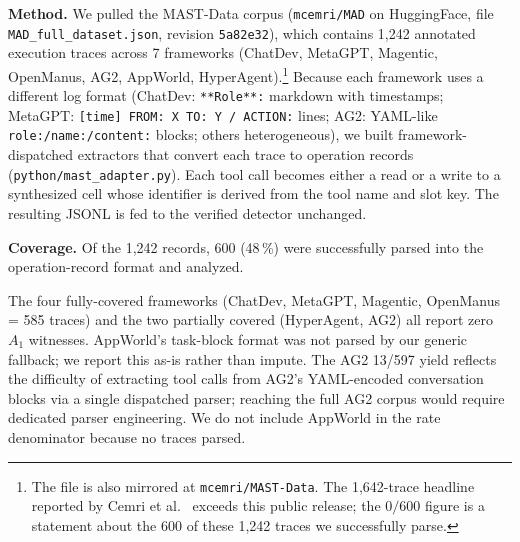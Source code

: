 \documentclass[journal,compsoc,10pt]{IEEEtran}
\providecommand{\citep}{\cite}
\theoremstyle{definition}
\theoremstyle{remark}
\begin{document}
\medskip
\noindent\textbf{Method.}
We pulled the MAST-Data corpus (\texttt{mcemri/MAD} on
HuggingFace, file \texttt{MAD\_full\_dataset.json}, revision
\texttt{5a82e32}), which contains 1{,}242 annotated execution
traces across 7 frameworks (ChatDev, MetaGPT, Magentic,
OpenManus, AG2, AppWorld, HyperAgent).\footnote{The file is
also mirrored at \texttt{mcemri/MAST-Data}. The 1{,}642-trace
headline reported by Cemri et al.~\citep{CemriEtAl2025MAST}
exceeds this public release; the $0/600$ figure is a statement
about the 600 of these 1{,}242 traces we successfully parse.} Because each
framework uses a different log format
(ChatDev: \texttt{**Role**:} markdown with timestamps;
MetaGPT: \texttt{[time] FROM: X TO: Y / ACTION:} lines;
AG2: YAML-like \texttt{role:/name:/content:} blocks;
others heterogeneous), we built framework-dispatched
extractors that convert each trace to operation records
(\texttt{python/mast\_adapter.py}). Each tool call becomes
either a read or a write to a synthesized cell whose
identifier is derived from the tool name and slot key. The
resulting JSONL is fed to the verified detector unchanged.

\medskip
\noindent\textbf{Coverage.}
Of the 1{,}242 records, 600 (48\,\%) were successfully parsed
into the operation-record format and analyzed.


The four fully-covered frameworks (ChatDev, MetaGPT,
Magentic, OpenManus = 585 traces) and the two partially
covered (HyperAgent, AG2) all report zero $A_1$ witnesses.
AppWorld's task-block format was not parsed by our generic
fallback; we report this as-is rather than impute. The
AG2 13/597 yield reflects the difficulty of extracting tool
calls from AG2's YAML-encoded conversation blocks via a
single dispatched parser; reaching the full AG2 corpus would
require dedicated parser engineering. We do not
include AppWorld in the rate denominator because no traces
parsed.
\end{document}
